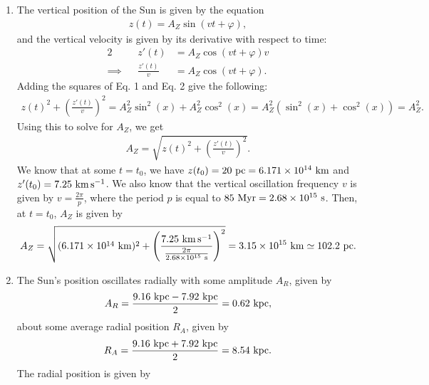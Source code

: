 \documentclass[11pt,letterpaper]{article}
\begin{document}
\begin{enumerate}[label=(\alph*)]
    \item The vertical position of the Sun is given by the equation 
        \begin{align}
            z(t) = A_Z\sin{(vt + \varphi)},
        \end{align}
        and the vertical velocity is given by its derivative with respect to time:
        \begin{alignat}{2}
            &&z'(t) &= A_Z\cos{(vt + \varphi)}v \nonumber\\
            \implies&&\frac{z'(t)}{v} &= A_Z\cos{(vt + \varphi)}.
        \end{alignat}
        Adding the squares of Eq. 1 and Eq. 2 give the following:
        \begin{align*}
            z(t)^2 + \left(\frac{z'(t)}{v}\right)^2 = A_Z^2\sin^2(x) + A_Z^2\cos^2(x) = A_Z^2(\sin^2(x) + \cos^2(x)) = A_Z^2.
        \end{align*}
        Using this to solve for $A_Z$, we get 
        \begin{align*}
            A_Z = \sqrt{z(t)^2 + \left(\frac{z'(t)}{v}\right)^2}.
        \end{align*}
        We know that at some $t=t_0$, we have $z(t_0) = 20~{\rm pc} = 6.171\times 10^{14}~{\rm km}$ and $z'(t_0) = 7.25~{\rm km\,s^{-1}}$. We also know that the vertical oscillation frequency $v$ is given by $v = \frac{2\pi}{p}$, where the period $p$ is equal to $85~{\rm Myr} = 2.68\times 10^{15}~{\rm s}$. Then, at $t=t_0$, $A_Z$ is given by 
        \begin{align*}
            A_Z = \sqrt{(6.171\times 10^{14}~{\rm km})^2 + \left(\frac{7.25~{\rm km\,s^{-1}}}{\frac{2\pi}{2.68\times 10^{15}~{\rm s}}}\right)^2} = 3.15\times 10^{15}~{\rm km} \simeq 102.2~{\rm pc}.
        \end{align*}
    \item The Sun's position oscillates radially with some amplitude $A_R$, given by 
        \begin{align*}
            A_R = \frac{9.16~{\rm kpc} - 7.92~{\rm kpc}}{2} = 0.62~{\rm kpc},
        \end{align*}
        about some average radial position $R_A$, given by 
        \begin{align*}
            R_A = \frac{9.16~{\rm kpc} + 7.92~{\rm kpc}}{2} = 8.54~{\rm kpc}.
        \end{align*}
        The radial position is given by 
        \begin{align*}

\end{align*}
\end{enumerate}
\end{document}
